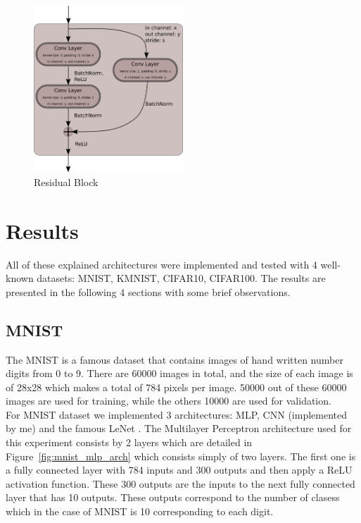 \documentclass[english,preprint,JIP]{ipsj}
\begin{document}
\begin{figure}
    \centering
    \includegraphics[width=0.5\textwidth]{img/resblock2.png}
    \caption{Residual Block}
    \label{fig:resblock}
\end{figure}
\section{Results}
All of these explained architectures were implemented and tested with 4
well-known datasets: MNIST, KMNIST, CIFAR10, CIFAR100. The results are presented
in the following 4 sections with some brief observations.\\

\subsection{MNIST}
The MNIST is a famous dataset that contains images of hand written number digits
from 0 to 9. There are 60000 images in total, and the size of each image is of
28x28 which makes a total of 784 pixels per image. 50000 out of these 60000
images are used for training, while the others 10000 are used for validation.\\

For MNIST dataset we implemented 3 architectures: MLP, CNN (implemented by me)
and the famous LeNet \cite{lenet}. The Multilayer Perceptron architecture used
for this experiment consists by 2 layers which are detailed in
Figure~\ref{fig:mnist_mlp_arch} which consists simply of two layers. The first
one is a fully connected layer with 784 inputs and 300 outputs and then apply a
ReLU activation function. These 300 outputs are the inputs to the next fully
connected layer that has 10 outputs. These outputs correspond to the number of
clasess which in the case of MNIST is 10 corresponding to each digit.\\
\end{document}
